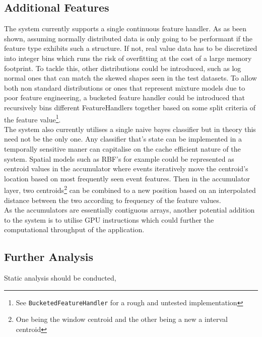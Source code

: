 \documentclass[a4paper,11pt]{scrreprt}
\begin{document}
\subsection{Additional Features}
The system currently supports a single continuous feature handler. As as been shown, assuming normally distributed data is only going to be performant if the feature type exhibits such a structure. If not, real value data has to be discretized into integer bins which runs the risk of overfitting at the cost of a large memory footprint. To tackle this, other distributions could be introduced, such as log normal ones that can match the skewed shapes seen in the test datasets. To allow both non standard distributions or ones that represent mixture models due to poor feature engineering, a bucketed feature handler could be introduced that recursively bins different FeatureHandlers together based on some split criteria of the feature value\footnote{See \verb|BucketedFeatureHandler| for a rough and untested implementation}.\\
The system also currently utilises a single naive bayes classifier but in theory this need not be the only one. Any classifier that's state can be implemented in a temporally sensitive maner can capitalise on the cache efficient nature of the system. Spatial models such as RBF's for example could be represented as centroid values in the accumulator where events iteratively move the centroid's location based on most frequently seen event features. Then in the accumulator layer, two centroids\footnote{One being the window centroid and the other being a new a interval centroid} can be combined to a new position based on an interpolated distance between the two according to frequency of the feature values.\\
As the accumulators are essentially contiguous arrays, another potential addition to the system is to utilise GPU instructions which could further the computational throughput of the application.
\subsection{Further Analysis}

Static analysis should be conducted,

\printbibliography
\end{document}
